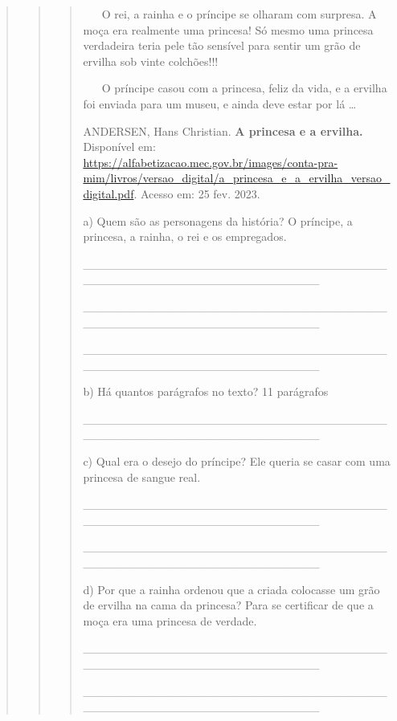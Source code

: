 \begin{quote}
\begin{quote}
\begin{quote}
~ ~ \protect\hypertarget{_Hlk128236047}{}{}O rei, a rainha e o príncipe
se olharam com surpresa. A moça era realmente uma princesa! Só mesmo uma
princesa verdadeira teria pele tão sensível para sentir um grão de
ervilha sob vinte colchões!!!

~ ~ O príncipe casou com a princesa, feliz da vida, e a ervilha foi
enviada para um museu, e ainda deve estar por lá \ldots{}

ANDERSEN, Hans Christian. \textbf{A princesa e a ervilha.} Disponível
em:
\url{https://alfabetizacao.mec.gov.br/images/conta-pra-mim/livros/versao_digital/a_princesa_e_a_ervilha_versao_digital.pdf}.
Acesso em: 25 fev. 2023.

a) Quem são as personagens da história? O príncipe, a princesa, a
rainha, o rei e os empregados.

\_\_\_\_\_\_\_\_\_\_\_\_\_\_\_\_\_\_\_\_\_\_\_\_\_\_\_\_\_\_\_\_\_\_\_\_\_\_\_\_\_\_\_\_\_\_\_\_\_\_\_\_\_\_\_\_\_\_\_\_\_\_\_\_

\_\_\_\_\_\_\_\_\_\_\_\_\_\_\_\_\_\_\_\_\_\_\_\_\_\_\_\_\_\_\_\_\_\_\_\_\_\_\_\_\_\_\_\_\_\_\_\_\_\_\_\_\_\_\_\_\_\_\_\_\_\_\_\_

\_\_\_\_\_\_\_\_\_\_\_\_\_\_\_\_\_\_\_\_\_\_\_\_\_\_\_\_\_\_\_\_\_\_\_\_\_\_\_\_\_\_\_\_\_\_\_\_\_\_\_\_\_\_\_\_\_\_\_\_\_\_\_\_

b) Há quantos parágrafos no texto? 11 parágrafos

\_\_\_\_\_\_\_\_\_\_\_\_\_\_\_\_\_\_\_\_\_\_\_\_\_\_\_\_\_\_\_\_\_\_\_\_\_\_\_\_\_\_\_\_\_\_\_\_\_\_\_\_\_\_\_\_\_\_\_\_\_\_\_\_

c) Qual era o desejo do príncipe? Ele queria se casar com uma princesa
de sangue real.

\_\_\_\_\_\_\_\_\_\_\_\_\_\_\_\_\_\_\_\_\_\_\_\_\_\_\_\_\_\_\_\_\_\_\_\_\_\_\_\_\_\_\_\_\_\_\_\_\_\_\_\_\_\_\_\_\_\_\_\_\_\_\_\_

\_\_\_\_\_\_\_\_\_\_\_\_\_\_\_\_\_\_\_\_\_\_\_\_\_\_\_\_\_\_\_\_\_\_\_\_\_\_\_\_\_\_\_\_\_\_\_\_\_\_\_\_\_\_\_\_\_\_\_\_\_\_\_\_

d) Por que a rainha ordenou que a criada colocasse um grão de ervilha na
cama da princesa? Para se certificar de que a moça era uma princesa de
verdade.

\_\_\_\_\_\_\_\_\_\_\_\_\_\_\_\_\_\_\_\_\_\_\_\_\_\_\_\_\_\_\_\_\_\_\_\_\_\_\_\_\_\_\_\_\_\_\_\_\_\_\_\_\_\_\_\_\_\_\_\_\_\_\_\_

\_\_\_\_\_\_\_\_\_\_\_\_\_\_\_\_\_\_\_\_\_\_\_\_\_\_\_\_\_\_\_\_\_\_\_\_\_\_\_\_\_\_\_\_\_\_\_\_\_\_\_\_\_\_\_\_\_\_\_\_\_\_\_\_


\end{quote}
\end{quote}
\end{quote}
